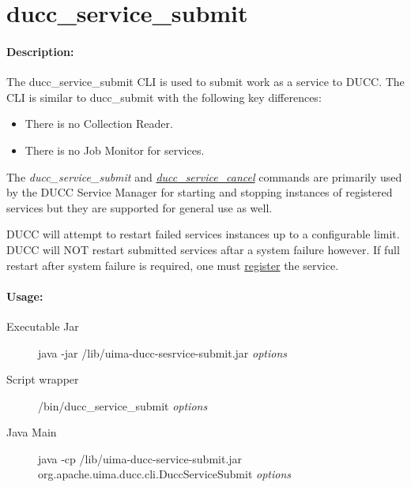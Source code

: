 \ifpdf
\else
{}
\fi
    \section{ducc\_service\_submit}
    \label{sec:cli.service-submit}
    \paragraph{Description:}
    The ducc\_service\_submit CLI is used to submit work as a service to DUCC. The CLI is similar to
    ducc\_submit with the following key differences:
    
    \begin{itemize}
        \item There is no Collection Reader. 
        \item There is no Job Monitor  for services.
    \end{itemize}
        
    The {\em ducc\_service\_submit} and \hyperref[sec:cli.service-cancel]{{\em
        ducc\_service\_cancel}} commands are primarily used by the DUCC Service Manager for starting
    and stopping instances of registered services but they are supported for general use as well.

    DUCC will attempt to restart failed services instances up to a configurable limit.  DUCC will
    NOT restart submitted services aftar a system failure however.  If full restart after system
    failure is required, one must \hyperref[subsec:cli.ducc-services.register]{register} the
    service.
 

    \paragraph{Usage:}
    \begin{description}
    \item[Executable Jar] java -jar \ducchome/lib/uima-ducc-sesrvice-submit.jar {\em options}
    \item[Script wrapper] \ducchome/bin/ducc\_service\_submit {\em options}
    \item[Java Main]      java -cp \ducchome/lib/uima-ducc-service-submit.jar org.apache.uima.ducc.cli.DuccServiceSubmit {\em options}
    \end{description}

